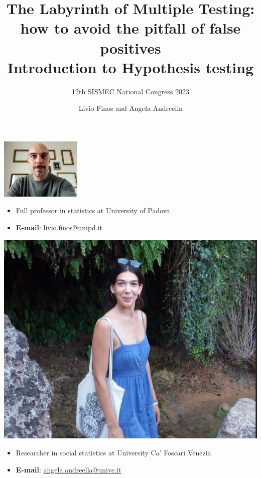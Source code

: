 \documentclass[xcolor={dvipsnames}]{beamer}
\title[]{The Labyrinth of Multiple Testing: how to avoid the pitfall of false positives \\
\vspace*{1cm} \large Introduction to Hypothesis testing}
\subtitle{\vspace*{2cm} \small 12th SISMEC National Congress 2023}
\date{}
\author[\hspace{5cm}]{Livio Finos and Angela Andreella}
\begin{document}
\begin{frame}
  \titlepage
\end{frame}

\begin{frame}
    \begin{minipage}[t]{0.45\textwidth}
\includegraphics[width= \textwidth]{Slides/MTP/plaatjes/Finos.jpg}
\begin{itemize}
    \item Full professor in statistics at  University of Padova
    \item \textbf{E-mail}: \href{mailto:livio.finos@unipd.it}{livio.finos@unipd.it} 
\end{itemize}

\end{minipage}\hfill
\begin{minipage}[t]{0.45\textwidth}
  \includegraphics[width= .95\textwidth]{Slides/MTP/plaatjes/Andreella.jpg}
\begin{itemize}
    \item Researcher in social statistics at  University Ca' Foscari Venezia
    \item \textbf{E-mail}: \href{mailto:angela.andreella@unive.it}{angela.andreella@unive.it} 
\end{itemize}

\end{minipage}
\end{frame}
\end{document}
